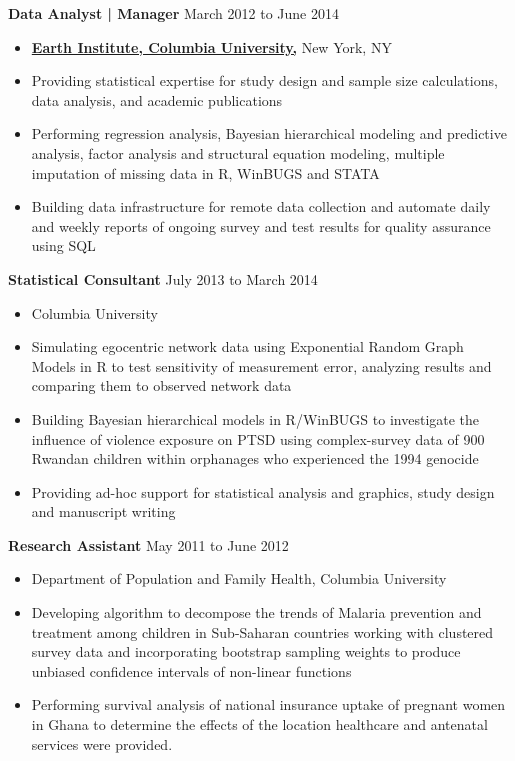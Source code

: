\documentclass[11pt]{article}
\newenvironment{innerlist}[1][\enskip\textbullet]%
        {\begin{itemize}[#1,leftmargin=*,parsep=0pt,itemsep=0pt,topsep=0pt,partopsep=0pt]}
        {\end{itemize}}
\begin{document}
\textbf{Data Analyst | Manager} \hfill {March 2012 to June 2014}
\begin{innerlist}
\item[] \href{http://www.ei.columbia.edu}{\textbf{Earth Institute, Columbia University,}} New York, NY\\
\item Providing statistical expertise for study design and sample size calculations, data analysis, and academic publications
\item Performing regression analysis, Bayesian hierarchical modeling and predictive analysis, factor analysis and structural equation modeling, multiple imputation of missing data in R, WinBUGS and STATA
\item Building data infrastructure for remote data collection and automate daily and weekly reports of ongoing survey and test results for quality assurance using SQL\\
\end{innerlist}

\textbf{Statistical Consultant} \hfill {July 2013 to March 2014}
\begin{innerlist}
\item[] Columbia University\\
\item Simulating egocentric network data using Exponential Random Graph Models in R to test sensitivity of measurement error, analyzing results and comparing them to observed network data
\item Building Bayesian hierarchical models in R/WinBUGS to investigate the influence of violence exposure on 
PTSD using complex-survey data of 900 Rwandan children within orphanages who experienced the 1994 genocide
\item Providing ad-hoc support for statistical analysis and graphics, study design and manuscript writing\\
\end{innerlist}

\textbf{Research Assistant} \hfill {May 2011 to June 2012}
\begin{innerlist}
\item[] Department of Population and Family Health, Columbia University\\
\item Developing algorithm to decompose the trends of Malaria prevention and treatment among children in Sub-Saharan countries working with clustered survey data and incorporating bootstrap sampling weights to produce unbiased confidence intervals of non-linear functions
\item Performing survival analysis of national insurance uptake of pregnant women in Ghana to determine the effects of the location healthcare and antenatal services were provided.\\
\end{innerlist}
\end{document}
